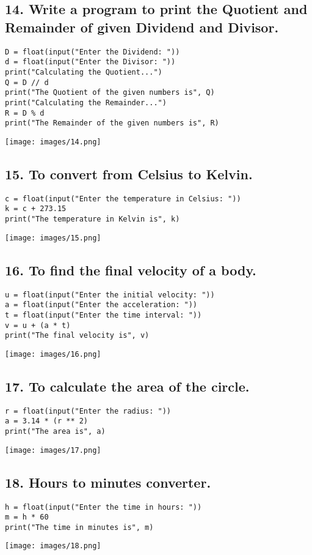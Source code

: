 \documentclass[12pt]{article}
\begin{document}
\subsection*{14. Write a program to print the Quotient and Remainder of given Dividend and Divisor.}
\begin{verbatim}
D = float(input("Enter the Dividend: "))
d = float(input("Enter the Divisor: "))
print("Calculating the Quotient...")
Q = D // d
print("The Quotient of the given numbers is", Q)
print("Calculating the Remainder...")
R = D % d
print("The Remainder of the given numbers is", R)
\end{verbatim}
\texttt{[image: images/14.png]}

\subsection*{15. To convert from Celsius to Kelvin.}
\begin{verbatim}
c = float(input("Enter the temperature in Celsius: "))
k = c + 273.15
print("The temperature in Kelvin is", k)
\end{verbatim}
\texttt{[image: images/15.png]}

\subsection*{16. To find the final velocity of a body.}
\begin{verbatim}
u = float(input("Enter the initial velocity: "))
a = float(input("Enter the acceleration: "))
t = float(input("Enter the time interval: "))
v = u + (a * t)
print("The final velocity is", v)
\end{verbatim}
\texttt{[image: images/16.png]}

\subsection*{17. To calculate the area of the circle.}
\begin{verbatim}
r = float(input("Enter the radius: "))
a = 3.14 * (r ** 2)
print("The area is", a)
\end{verbatim}
\texttt{[image: images/17.png]}

\subsection*{18. Hours to minutes converter.}
\begin{verbatim}
h = float(input("Enter the time in hours: "))
m = h * 60
print("The time in minutes is", m)
\end{verbatim}
\texttt{[image: images/18.png]}
\end{document}
